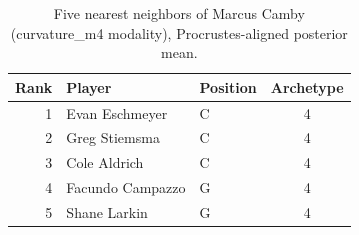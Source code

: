 \begin{table}[htbp]
  \centering\small
  \begin{tabular}{rllc}
    \toprule
    Rank & Player & Position & Archetype \\
    \midrule
    1 & Evan Eschmeyer & C & 4 \\
    2 & Greg Stiemsma & C & 4 \\
    3 & Cole Aldrich & C & 4 \\
    4 & Facundo Campazzo & G & 4 \\
    5 & Shane Larkin & G & 4 \\
    \bottomrule
  \end{tabular}
  \caption{Five nearest neighbors of Marcus Camby (curvature_m4 modality), Procrustes-aligned posterior mean.}
  \label{tab:Marcus_Camby_neighbors_curvature_m4}
\end{table}

